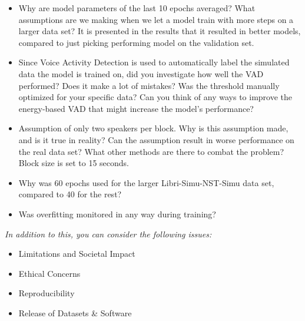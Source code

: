 \documentclass{article}
\begin{document}
\begin{itemize}
    \item Why are model parameters of the last 10 epochs averaged? What assumptions are we making when we let a model train with more steps on a larger data set? It is presented in the results that it resulted in better models, compared to just picking performing model on the validation set.
    \item Since Voice Activity Detection is used to automatically label the simulated data the model is trained on, did you investigate how well the VAD performed? Does it make a lot of mistakes? Was the threshold manually optimized for your specific data? Can you think of any ways to improve the energy-based VAD that might increase the model's performance? 
    \item Assumption of only two speakers per block. Why is this assumption made, and is it true in reality? Can the assumption result in worse performance on the real data set? What other methods are there to combat the problem? Block size is set to 15 seconds.
    \item Why was 60 epochs used for the larger Libri-Simu-NST-Simu data set, compared to 40 for the rest? 
    \item Was overfitting monitored in any way during training?
\end{itemize}


\textit{In addition to this, you can consider the following issues:}

\begin{itemize}
    \item Limitations and Societal Impact
    \item Ethical Concerns
    \item Reproducibility
    \item Release of Datasets \& Software
\end{itemize}
\end{document}
